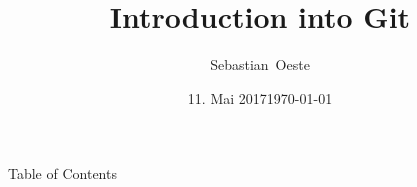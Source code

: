 \documentclass[11pt]{beamer}
\date{11. Mai 2017}
\institute[ZIH TUD]{Zentrum f\"{u}r Informationsdienste und Hochleistungsrechnen -- TU Dresden}
\title[LCTP]{Introduction into Git}
\author[Oeste]{Sebastian~Oeste}
\date{\today}
\begin{document}
\zihmaketitle

\begin{frame}{Table of Contents}
    \tableofcontents
\end{frame}






\end{document}
